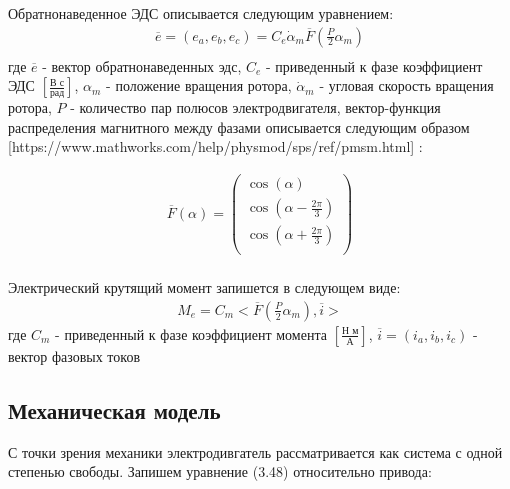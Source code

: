 {Обратнонаведенное ЭДС описывается следующим уравнением:
\begin{equation}
\label{eq:p3:9.2}
\begin{alignedat}{2}
\overline{e} = (e_a, e_b, e_c) = C_e \dot{\alpha}_m \overline{F}(\frac{\textit{P}}{2}\alpha_m)\\
\end{alignedat}
\end{equation}
где 
$\overline{e}$ - вектор обратнонаведенных эдс, 
$C_e$ - приведенный к фазе коэффициент ЭДС $[\frac{\textit{В с}}{\textit{рад}} ]$,
$\alpha_m$ - положение вращения ротора, 
$\dot{\alpha}_m$ - угловая скорость вращения ротора, 
$\textit{P}$ - количество пар полюсов электродвигателя, 
вектор-функция распределения магнитного между фазами описывается следующим образом
 [https://www.mathworks.com/help/physmod/sps/ref/pmsm.html]
 :

\begin{equation}
\label{eq:p3:9.3}
\begin{alignedat}{2}
\overline{F}(\alpha) = \left( \begin{matrix}
\cos (\alpha) \\
\cos (\alpha - \frac{2 \pi}{3}) \\
\cos (\alpha + \frac{2 \pi}{3}) \\
\end{matrix}
\right) \\
\end{alignedat}
\end{equation}

Электрический крутящий момент запишется в следующем виде:
\begin{equation}
\label{eq:p3:9.4}
\begin{alignedat}{2}
M_e = C_m <\overline{F}(\frac{\textit{P}}{2}\alpha_m),\overline{i}>
\end{alignedat}
\end{equation}
где
$C_m$ - приведенный к фазе коэффициент момента $[\frac{\textit{Н м}}{\textit{А}} ]$,
$\overline{i} = (i_a, i_b, i_c)$ - вектор фазовых токов

\subsection{Механическая модель} \label{sec:ch3/sec9/sub3}



С точки зрения механики электродивгатель рассматривается как система с одной степенью свободы. Запишем уравнение (3.48) относительно привода:

}
